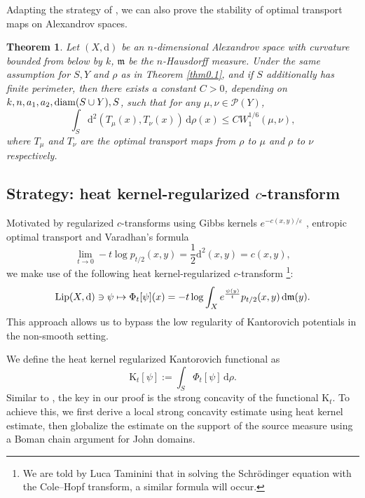 \documentclass[a4paper,11pt]{article}
\numberwithin{equation}{section}
\theoremstyle{plain}
\newtheorem{theorem}{Theorem}[section]
\theoremstyle{definition}
\theoremstyle{remark}
\newcommand{\mm}{\mathfrak m}
\newcommand{\K}{\mathrm{K}}
\newcommand{\diam}{\mathop{\rm diam}\nolimits}
\newcommand{\Lip}{\mathop{\rm Lip}\nolimits}
\renewcommand{\d}{{\mathrm d}}
\begin{document}
	Adapting the  strategy of \cite{arXiv:2504.05412}, we can also prove the stability of optimal transport maps on Alexandrov spaces.
		\begin{theorem}\label{thm0.2}
		Let $(X,  \d)$ be an $n$-dimensional Alexandrov space with curvature bounded from below by $k$, $\mm$ be the $n$-Hausdorff measure. Under the same assumption for $S, Y$ and $\rho$ as in Theorem \ref{thm0.1}, and if $S$ additionally has finite perimeter, then there exists a constant $C>0$, depending on $k,n,a_1, a_2, \diam(S\cup Y),   S$, such that for any $\mu,\nu\in\mathcal{P}(Y)$, 
		\begin{equation}
			\int_S \d^2(T_\mu(x), T_\nu(x))\,\d \rho(x) \leq CW_1^{1/6}(\mu, \nu),
		\end{equation}
		where $T_\mu$ and $T_\nu$ are the optimal transport maps from $\rho$ to $\mu$ and $\rho$ to $\nu$ respectively.
	\end{theorem}
	
     


	
	
	\subsection{Strategy: heat kernel-regularized \texorpdfstring{$c$}{c}-transform}
	
	
	
Motivated by   regularized $c$-transforms  using  Gibbs kernels $e^{-c(x, y)/\varepsilon}$ \cite{arXiv:2504.05412},  entropic optimal transport \cite{GTJEMS, GTT25}  and Varadhan's formula
\[
\lim_{t \to 0} -t \log p_{t/2}(x, y) = \frac{1}{2} \d^2(x, y)=c(x,y),
\]
 we make use of the following {heat kernel-regularized $c$-transform} \footnote{We are told by Luca Taminini that in  solving the Schr\"odinger equation with the Cole--Hopf transform,  a similar formula will occur.}:
\[
\Lip(X, \d) \ni \psi  \mapsto \Phi_t[\psi](x) = -t \log \int_X e^{\frac{\psi(y)}{t}} p_{t/2}(x, y) \, \d\mm(y).
\]
This approach  allows us to bypass the low regularity of Kantorovich potentials in the non-smooth setting. 

We define the heat kernel regularized Kantorovich functional as
	\begin{equation*}
		\K_t[\psi]:=\int_S \Phi_t[\psi]\,\d\rho.
	\end{equation*}
Similar to \cite{arXiv:2504.05412},  the key in our proof is the strong concavity of the functional $\K_t$.
To achieve this,  we  first derive a local strong concavity estimate using heat kernel estimate,    then globalize the estimate on the support of the source measure using a Boman chain argument for John domains.
\end{document}
